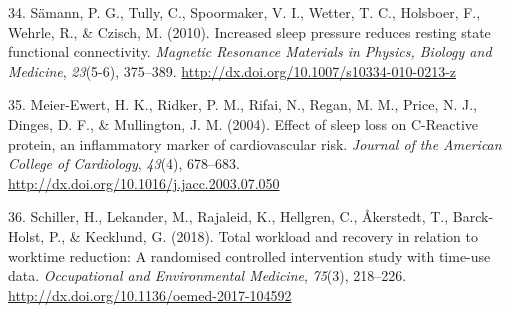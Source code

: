 \documentclass[
  english,
  man, donotrepeattitle,floatsintext]{apa6}
\newlength{\cslhangindent}
\newenvironment{cslreferences}%
  {\setlength{\parindent}{0pt}%
  \everypar{\setlength{\hangindent}{\cslhangindent}}\ignorespaces}%
  {\par}
\begin{document}
\begin{cslreferences}
\leavevmode\hypertarget{ref-Samann2010}{}%
34. Sämann, P. G., Tully, C., Spoormaker, V. I., Wetter, T. C., Holsboer, F., Wehrle, R., \& Czisch, M. (2010). Increased sleep pressure reduces resting state functional connectivity. \emph{Magnetic Resonance Materials in Physics, Biology and Medicine}, \emph{23}(5-6), 375--389. \url{http://dx.doi.org/10.1007/s10334-010-0213-z}

\leavevmode\hypertarget{ref-Meier-Ewert2004}{}%
35. Meier-Ewert, H. K., Ridker, P. M., Rifai, N., Regan, M. M., Price, N. J., Dinges, D. F., \& Mullington, J. M. (2004). Effect of sleep loss on C-Reactive protein, an inflammatory marker of cardiovascular risk. \emph{Journal of the American College of Cardiology}, \emph{43}(4), 678--683. \url{http://dx.doi.org/10.1016/j.jacc.2003.07.050}

\leavevmode\hypertarget{ref-Schiller2018}{}%
36. Schiller, H., Lekander, M., Rajaleid, K., Hellgren, C., Åkerstedt, T., Barck-Holst, P., \& Kecklund, G. (2018). Total workload and recovery in relation to worktime reduction: A randomised controlled intervention study with time-use data. \emph{Occupational and Environmental Medicine}, \emph{75}(3), 218--226. \url{http://dx.doi.org/10.1136/oemed-2017-104592}
\end{cslreferences}
\end{document}
